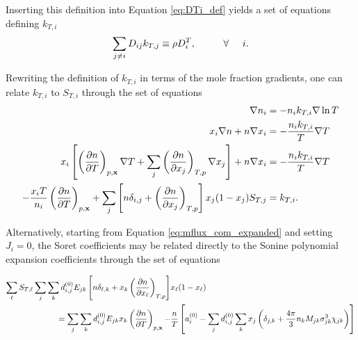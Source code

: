 Inserting this definition into Equation \eqref{eq:DTi_def} yields a set of equations defining $k_{T,i}$
\begin{equation}
    \sum_{j \neq i} D_{ij} k_{T,j} \equiv \rho D_i^T, \hspace{1cm} \forall \hspace{.5cm} i.
\end{equation}

Rewriting the definition of $k_{T,i}$ in terms of the mole fraction gradients, one can relate $k_{T,i}$ to $S_{T,i}$ through the set of equations
\begin{equation}
    \begin{split}
        \nabla n_i &= - n_i k_{T,i} \nabla \ln T\\
        x_i \nabla n + n \nabla x_i &= - \frac{n_i k_{T,i}}{T} \nabla T\\
        x_i \left[ \left(\frac{\partial n}{\partial T}\right)_{p,\boldsymbol{\mathrm{x}}}\nabla T + \sum_j \left(\frac{\partial n}{\partial x_j}\right)_{T,p} \nabla x_j \right] + n \nabla x_i &= - \frac{n_i k_{T,i}}{T} \nabla T\\
        - \frac{x_i T}{n_i} \left(\frac{\partial n}{\partial T}\right)_{p,\boldsymbol{\mathrm{x}}} + \sum_j \left[ n \delta_{i,j} + \left(\frac{\partial n}{\partial x_j}\right)_{T,p} \right] x_j(1 - x_j) S_{T,j} &= k_{T,i}.
    \end{split}
\end{equation}

Alternatively, starting from Equation \eqref{eq:mflux_com_expanded} and setting $J_i = 0$, the Soret coefficients may be related directly to the Sonine polynomial expansion coefficients through the set of equations

\begin{equation}
    \begin{split}
        \sum_\ell S_{T,\ell} \sum_j \sum_k d_{i,j}^{(0)}E_{jk}\left[ n \delta_{\ell, k} + x_k \left(\frac{\partial n}{\partial x_{\ell}}\right)_{T,p}\right] & x_{\ell} (1 - x_{\ell}) \\
        = \sum_j \sum_k d_{i,j}^{(0)} E_{jk}x_k \left(\frac{\partial n}{\partial T}\right)_{p,\boldsymbol{\mathrm{x}}} -& \frac{n}{T}\left[ a_i^{(0)} - \sum_j d_{i,j}^{(0)} \sum_k x_j\left( \delta_{j,k} + \frac{4\pi}{3}n_kM_{jk} \sigma_{jk}^3 \chi_{jk} \right) \right]
    \end{split}
\end{equation}